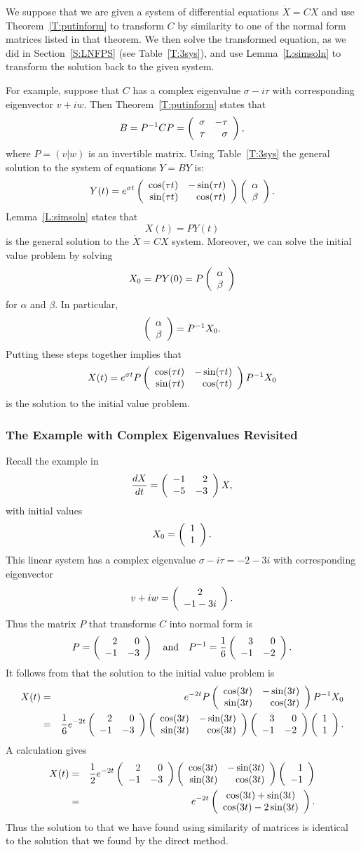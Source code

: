 \documentclass{ximera}
\begin{document}
We suppose that we are given a system of differential equations $\dot{X}=CX$
and use Theorem~\ref{T:putinform} to transform $C$ by similarity to one of
the normal form matrices listed in that theorem.  We then solve the
transformed equation, as we did in Section~\ref{S:LNFPS} (see
Table~\ref{T:3sys}), and use Lemma~\ref{L:simsoln} to transform the solution
back to the given system.

For example, suppose that $C$ has a complex eigenvalue $\sigma-i\tau$ with
corresponding eigenvector $v+iw$.  Then Theorem~\ref{T:putinform} states that
\[
B = P^{-1} CP = \left(\begin{array}{rr} \sigma & -\tau\\ \tau &\sigma\end{array}\right),
\]
where $P=(v|w)$ is an invertible matrix.  Using Table~\ref{T:3sys} the
general solution to the system of equations $\dot{Y}=BY$ is:
\[
Y(t) = e^{\sigma t}
\left(\begin{array}{rr} \cos(\tau t) & -\sin(\tau t)\\ \sin(\tau t) &\cos(\tau t)\end{array}\right)
\left(\begin{array}{r} \alpha \\ \beta\end{array}\right).
\]
Lemma~\ref{L:simsoln} states that
\[
X(t) = PY(t)
\]
is the general solution to the $\dot{X}=CX$ system.  Moreover, we can solve
the initial value problem by solving
\[
X_0 = PY(0) = P\left(\begin{array}{r} \alpha \\ \beta\end{array}\right)
\]
for $\alpha$ and $\beta$.  In particular,
\[
\left(\begin{array}{r} \alpha \\ \beta\end{array}\right) = P^{-1} X_0.
\]
Putting these steps together implies that
\begin{equation} \label{e:exp0ev}
X(t) = e^{\sigma t}
P\left(\begin{array}{rr} \cos(\tau t) & -\sin(\tau t)\\ \sin(\tau t) &\cos(\tau t)\end{array}\right)P^{-1} X_0
\end{equation}
is the solution to the initial value problem.

\subsubsection*{The Example with Complex Eigenvalues Revisited}

Recall the example in 
\[
\frac{dX}{dt} = \left(\begin{array}{rr} -1 & 2\\ -5 &-3\end{array}\right) X,
\]
with initial values
\[
X_0=\left(\begin{array}{r} 1 \\ 1\end{array}\right).
\]
This linear system has a complex eigenvalue $\sigma-i\tau=-2-3i$ with
corresponding eigenvector
\[
v+iw = \left(\begin{array}{c} 2 \\ -1-3i\end{array}\right).
\]
Thus the matrix $P$ that transforms $C$ into normal form is
\[
P = \left(\begin{array}{rr} 2 & 0\\ -1 &-3\end{array}\right) \quad\mbox{and}\quad P^{-1} = \frac{1}{6}\left(\begin{array}{rr} 3 & 0\\ -1 &-2\end{array}\right).
\]
It follows from  that the solution to the initial value problem
is
\begin{eqnarray*}
X(t) & =  &
e^{-2t}P\left(\begin{array}{rr} \cos(3t) & -\sin(3t)\\ \sin(3t) &\cos(3t)\end{array}\right)P^{-1} X_0 \\ & = &
\frac{1}{6}e^{-2t}\left(\begin{array}{rr} 2 & 0\\ -1 &-3\end{array}\right)
\left(\begin{array}{rr} \cos(3t) & -\sin(3t)\\ \sin(3t) &\cos(3t)\end{array}\right)
\left(\begin{array}{rr} 3 & 0\\ -1 &-2\end{array}\right)\left(\begin{array}{r} 1 \\ 1\end{array}\right).
\end{eqnarray*}
A calculation gives
\begin{eqnarray*}
X(t) & = & \frac{1}{2}e^{-2t}\left(\begin{array}{rr} 2 & 0\\ -1 &-3\end{array}\right)
\left(\begin{array}{rr} \cos(3t) & -\sin(3t)\\ \sin(3t) &\cos(3t)\end{array}\right)\left(\begin{array}{r} 1 \\ -1\end{array}\right)  \\
& = & e^{-2t}
\left(\begin{array}{c} \cos(3t)+\sin(3t) \\ \cos(3t)-2\sin(3t)\end{array}\right).
\end{eqnarray*}
Thus the solution to  that we have found using 
similarity of matrices is identical to the solution 
that we found by the direct method.
\end{document}
